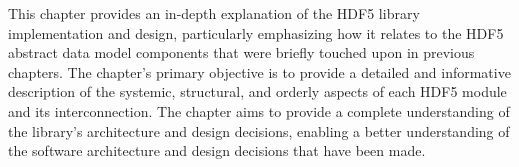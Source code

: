 This chapter provides an in-depth explanation of the HDF5 library implementation and design, particularly emphasizing how it relates to the HDF5 abstract data model components that were briefly touched upon in previous chapters. The chapter's primary objective is to provide a detailed and informative description of the systemic, structural, and orderly aspects of each HDF5 module and its interconnection. The chapter aims to provide a complete understanding of the library's architecture and design decisions, enabling a better understanding of the software architecture and design decisions that have been made.

